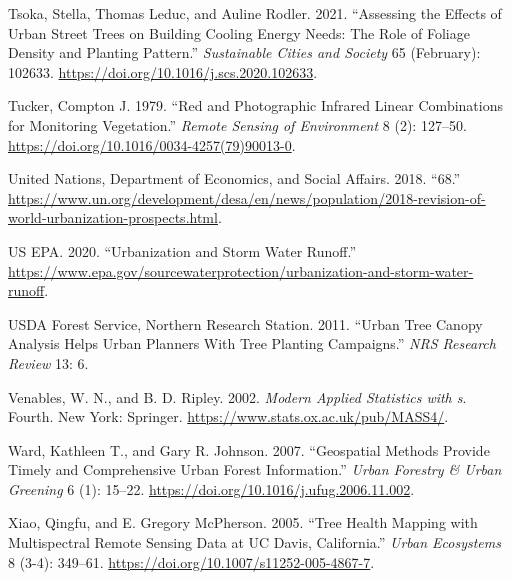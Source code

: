 \documentclass[12pt,twoside]{reedthesis}
\newlength{\cslhangindent}
\newenvironment{CSLReferences}[2] %
 {%
  \setlength{\parindent}{0pt}
  \ifodd #1 \everypar{\setlength{\hangindent}{\cslhangindent}}\ignorespaces\fi
  \ifnum #2 > 0
  \setlength{\parskip}{#2\baselineskip}
  \fi
 }%
 {}
\begin{document}
\begin{CSLReferences}{1}{0}
\leavevmode{}%
Tsoka, Stella, Thomas Leduc, and Auline Rodler. 2021. {``Assessing the Effects of Urban Street Trees on Building Cooling Energy Needs: The Role of Foliage Density and Planting Pattern.''} \emph{Sustainable Cities and Society} 65 (February): 102633. \url{https://doi.org/10.1016/j.scs.2020.102633}.

\leavevmode{}%
Tucker, Compton J. 1979. {``Red and Photographic Infrared Linear Combinations for Monitoring Vegetation.''} \emph{Remote Sensing of Environment} 8 (2): 127--50. \url{https://doi.org/10.1016/0034-4257(79)90013-0}.

\leavevmode{}%
United Nations, Department of Economics, and Social Affairs. 2018. {``68.''} \url{https://www.un.org/development/desa/en/news/population/2018-revision-of-world-urbanization-prospects.html}.

\leavevmode{}%
US EPA. 2020. {``Urbanization and Storm Water Runoff.''} \url{https://www.epa.gov/sourcewaterprotection/urbanization-and-storm-water-runoff}.

\leavevmode{}%
USDA Forest Service, Northern Research Station. 2011. {``Urban Tree Canopy Analysis Helps Urban Planners With Tree Planting Campaigns.''} \emph{NRS Research Review} 13: 6.

\leavevmode{}%
Venables, W. N., and B. D. Ripley. 2002. \emph{Modern Applied Statistics with s}. Fourth. New York: Springer. \url{https://www.stats.ox.ac.uk/pub/MASS4/}.

\leavevmode{}%
Ward, Kathleen T., and Gary R. Johnson. 2007. {``Geospatial Methods Provide Timely and Comprehensive Urban Forest Information.''} \emph{Urban Forestry \& Urban Greening} 6 (1): 15--22. \url{https://doi.org/10.1016/j.ufug.2006.11.002}.

\leavevmode{}%
Xiao, Qingfu, and E. Gregory McPherson. 2005. {``Tree Health Mapping with Multispectral Remote Sensing Data at UC Davis, California.''} \emph{Urban Ecosystems} 8 (3-4): 349--61. \url{https://doi.org/10.1007/s11252-005-4867-7}.

\end{CSLReferences}

\end{document}

